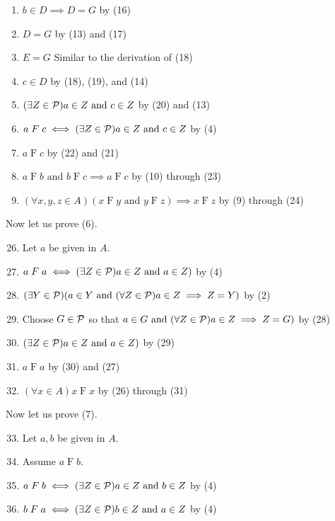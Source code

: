 \documentclass{report}
\renewcommand*{\land}{\text{ and }}
\begin{document}
\begin{solution}
\begin{enumerate}[label=(\arabic*)]
    \item \quad\quad $b\in D \implies D=G$ \hfill by (16)
    \item \quad\quad $D=G$ \hfill by (13) and (17)
    \item \quad\quad $E=G$ \hfill Similar to the derivation of (18)
    \item \quad\quad $c\in D$ \hfill by (18), (19), and (14)
    \item \quad\quad $(\exists Z\in\mc P)a\in Z\land c\in Z$ \hfill by (20) and (13)
    \item \quad\quad $a\mathrel F c \iff (\exists Z\in\mc P) a\in Z\land c\in Z$ \hfill by (4)
    \item \quad\quad $a\mathrel F c$ \hfill by (22) and (21)
    \item \quad $a\mathrel F b\land b\mathrel F c \implies a\mathrel F c$ \hfill by (10) through (23)
    \item $(\forall x,y,z\in A)(x\mathrel F y\land y\mathrel F z)\implies x\mathrel F z$ \hfill by (9) through (24)
\end{enumerate}
Now let us prove (6).
\begin{enumerate}[label=(\arabic*)]
    \setcounter{enumi}{25}
    \item Let $a$ be given in $A$.
    \item \quad $a\mathrel F a \iff (\exists Z\in\mc P)a\in Z\land a\in Z)$ \hfill by (4)
    \item \quad $(\exists Y\in\mc P)(a\in Y\land (\forall Z\in\mc P)a\in Z\implies Z=Y)$ \hfill by (2)
    \item \quad Choose $G\in\mathcal{P}$ so that $a\in G\land (\forall Z\in\mc P)a\in Z\implies Z=G)$ \hfill by (28)
    \item \quad $(\exists Z\in\mc P)a\in Z\land a\in Z)$ \hfill by (29)
    \item \quad $a\mathrel F a$ \hfill by (30) and (27)
    \item $(\forall x\in A)x\mathrel F x$ \hfill by (26) through (31)
\end{enumerate}
Now let us prove (7).
\begin{enumerate}[label=(\arabic*)]
    \setcounter{enumi}{32}
    \item Let $a,b$ be given in $A$.
    \item \quad Assume $a\mathrel F b$.
    \item \quad\quad $a\mathrel F b\iff (\exists Z\in\mc P)a\in Z\land b\in Z$ \hfill by (4)
    \item \quad\quad $b\mathrel F a\iff (\exists Z\in\mc P)b\in Z\land a\in Z$ \hfill by (4)

\end{enumerate}
\end{solution}
\end{document}
